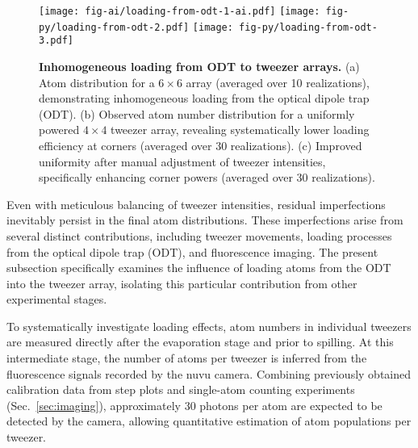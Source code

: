 




\begin{figure}
    \centering
    \texttt{[image: fig-ai/loading-from-odt-1-ai.pdf]}
    \phantom{42}
    \texttt{[image: fig-py/loading-from-odt-2.pdf]}
    \phantom{42}
    \texttt{[image: fig-py/loading-from-odt-3.pdf]}
    \caption[Inhomogeneous loading from ODT to tweezer arrays]{
    \textbf{Inhomogeneous loading from ODT to tweezer arrays.}
    (a) Atom distribution for a $6\times6$ array (averaged over 10 realizations), demonstrating inhomogeneous loading from the optical dipole trap (ODT).
    (b) Observed atom number distribution for a uniformly powered $4\times4$ tweezer array, revealing systematically lower loading efficiency at corners (averaged over 30 realizations).
    (c) Improved uniformity after manual adjustment of tweezer intensities, specifically enhancing corner powers (averaged over 30 realizations).
    }
    \label{fig:loading-from-odt}
\end{figure}



Even with meticulous balancing of tweezer intensities, residual imperfections inevitably persist in the final atom distributions. These imperfections arise from several distinct contributions, including tweezer movements, loading processes from the optical dipole trap (ODT), and fluorescence imaging. The present subsection specifically examines the influence of loading atoms from the ODT into the tweezer array, isolating this particular contribution from other experimental stages.

To systematically investigate loading effects, atom numbers in individual tweezers are measured directly after the evaporation stage and prior to spilling. At this intermediate stage, the number of atoms per tweezer is inferred from the fluorescence signals recorded by the nuvu camera. Combining previously obtained calibration data from step plots and single-atom counting experiments (Sec.~\ref{sec:imaging}), approximately 30 photons per atom are expected to be detected by the camera, allowing quantitative estimation of atom populations per tweezer.

